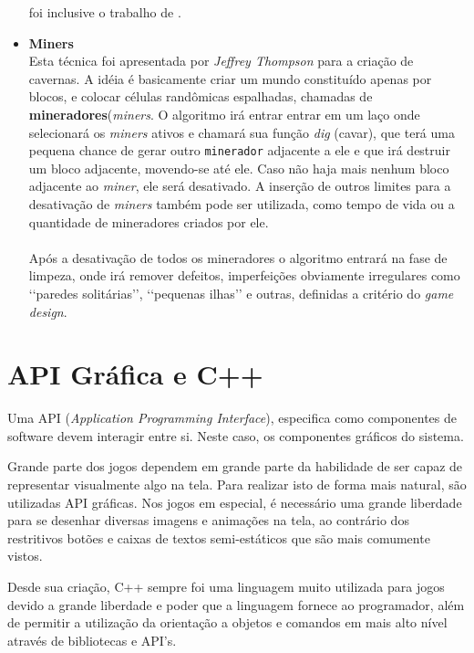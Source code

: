 \begin{itemize}
			foi inclusive o trabalho de \cite{automaticDunGen}.
		\item \textbf{Miners}
			\\Esta técnica foi apresentada por \textit{Jeffrey Thompson}\cite{Noel} para a criação de cavernas. A idéia é basicamente criar 
			um mundo constituído apenas por blocos, e colocar células randômicas espalhadas, chamadas de 
			\textbf{mineradores}(\textit{miners}. O algoritmo irá entrar entrar em um laço onde selecionará os \textit{miners} ativos e 
			chamará sua função \textit{dig} (cavar), que terá uma pequena chance de gerar outro \texttt{minerador} adjacente a ele 
			e que irá destruir um bloco adjacente, movendo-se até ele. Caso não haja mais nenhum bloco adjacente ao \textit{miner}, ele será desativado. 
			A inserção de outros limites para a desativação de \textit{miners} também pode ser utilizada, como tempo de vida ou a 
			quantidade de mineradores criados por ele.
			\\ \\ Após a desativação de todos os mineradores o algoritmo entrará na fase de limpeza, onde irá remover
			defeitos, imperfeições obviamente irregulares como \lq\lq{paredes solitárias}\rq\rq{}, \lq\lq{pequenas ilhas}\rq\rq{} e outras, definidas a critério do \textit{game design}.
		\end{itemize}
		
\section{API Gráfica e C++}
Uma API (\textit{Application Programming Interface}), especifica como componentes de software devem interagir entre si. Neste caso, os componentes gráficos do sistema.

Grande parte dos jogos dependem em grande parte da habilidade de ser capaz de representar visualmente algo na tela. Para realizar isto de forma mais natural, são utilizadas API gráficas. Nos jogos em especial, é necessário uma grande liberdade para se desenhar diversas imagens e animações na tela, ao contrário dos restritivos botões e caixas de textos semi-estáticos que são mais comumente vistos. 

Desde sua criação, C++ sempre foi uma linguagem muito utilizada para jogos devido a grande liberdade e poder que a linguagem fornece ao programador, além de permitir a utilização da orientação a objetos e comandos em mais alto nível através de bibliotecas e API's.

